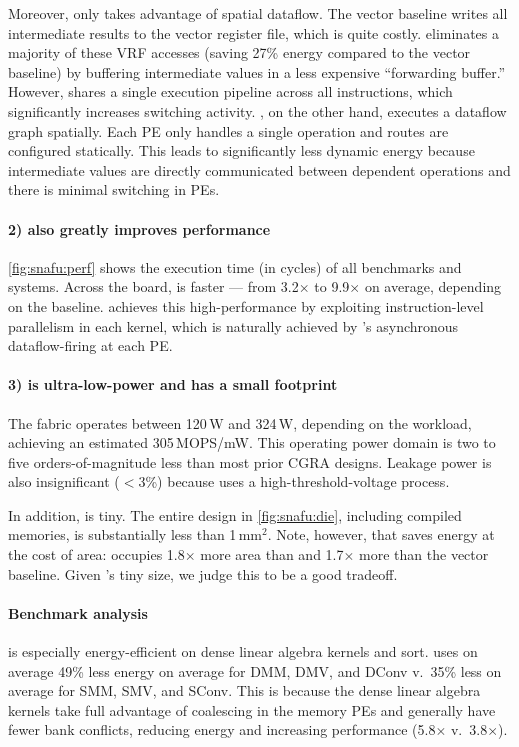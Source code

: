 Moreover, only \snafuarch takes advantage of spatial dataflow.
%
The vector baseline writes all intermediate results to the vector register file, which is quite costly.
% 
\manic eliminates a majority of these VRF accesses (saving 27\% energy compared to the vector baseline) by 
buffering intermediate values in a less expensive ``forwarding buffer.''
% 
However, \manic shares a single execution pipeline across all instructions,
% 
which significantly increases switching activity. 
% 
\snafuarch, on the other hand, executes a dataflow graph spatially.
% 
Each PE only handles a single operation and routes are configured statically.
% 
This leads to significantly less dynamic energy because intermediate values are directly communicated between dependent operations and there is minimal switching in PEs.

\paragraph{2) \snafuarch also greatly improves performance}
\autoref{fig:snafu:perf} shows the execution time (in cycles) of all benchmarks and systems.
% 
Across the board, \snafuarch is faster --- from 3.2$\times$ to 9.9$\times$ on average, depending on the baseline. 
% 
\snafuarch achieves this high-performance by exploiting instruction-level parallelism in each kernel,
%
which is naturally achieved by \snafuframe's asynchronous dataflow-firing at each PE.

\paragraph{3) \snafuarch is ultra-low-power and has a small footprint}
% 
The \snafuarch fabric operates between 120\,\textmu W and 324\,\textmu W, depending on the workload, achieving an estimated 305\,MOPS/mW.
% 
This operating power domain is two to five orders-of-magnitude less than most prior CGRA designs.
% 
Leakage power is also insignificant ($<$3\%) because \snafuarch uses a high-threshold-voltage process.
% 

In addition, \snafuarch is tiny.
The entire design in \autoref{fig:snafu:die}, including compiled memories, is substantially less than 1\,mm$^2$.
Note, however, that \snafuarch saves energy at the cost of area:
\snafuarch occupies 1.8$\times$ more area than \manic and 1.7$\times$ more than the vector baseline.
%
Given \snafuarch's tiny size, we judge this to be a good tradeoff.

\paragraph{Benchmark analysis}
\snafuarch is especially energy-efficient on dense linear algebra kernels and sort.
% 
\snafuarch uses on average 49\% less energy on average for DMM, DMV, and DConv v.\ 35\% less on average for SMM, SMV, and SConv. 
% 
This is because the dense linear algebra kernels take full advantage of coalescing in the memory PEs and generally have fewer bank conflicts, reducing energy and increasing performance (5.8$\times$ v.\ 3.8$\times$). 
 
